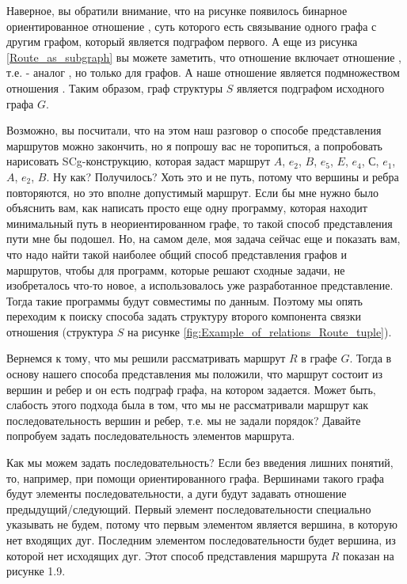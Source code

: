 Наверное, вы обратили внимание, что на рисунке появилось бинарное
ориентированное отношение , суть которого есть
связывание одного графа с другим графом, который является подграфом
первого. А еще из рисунка \ref{Route_as_subgraph} вы можете заметить,
что отношение  включает отношение ,
т.е.  - аналог , но только для
графов. А наше отношение  является подмножеством
отношения . Таким образом, граф структуры $S$ является
подграфом исходного графа $G$.

Возможно, вы посчитали, что на этом наш разговор о способе
представления маршрутов можно закончить, но я попрошу вас не
торопиться, а попробовать нарисовать SCg-конструкцию, которая задаст
маршрут $A$, $e_2$, $B$, $e_5$, $E$, $e_4$, $С$, $e_1$, $A$, $e_2$,
$B$. Ну как? Получилось? Хоть это и не путь, потому что вершины и
ребра повторяются, но это вполне допустимый маршрут. Если бы мне нужно
было объяснить вам, как написать просто еще одну программу, которая
находит минимальный путь в неориентированном графе, то такой способ
представления пути мне бы подошел. Но, на самом деле, моя задача
сейчас еще и показать вам, что надо найти такой наиболее общий способ
представления графов и маршрутов, чтобы для программ, которые решают
сходные задачи, не изобреталось что-то новое, а использовалось уже
разработанное представление. Тогда такие программы будут совместимы по
данным. Поэтому мы опять переходим к поиску способа задать структуру
второго компонента связки отношения  (структура $S$ на
рисунке \ref{fig:Example_of_relations_Route_tuple}).

Вернемся к тому, что мы решили рассматривать маршрут $R$ в графе
$G$. Тогда в основу нашего способа представления мы положили, что
маршрут состоит из вершин и ребер и он есть подграф графа, на котором
задается. Может быть, слабость этого подхода была в том, что мы не
рассматривали маршрут как последовательность вершин и ребер, т.е. мы
не задали порядок? Давайте попробуем задать последовательность
элементов маршрута.

Как мы можем задать последовательность? Если без введения лишних
понятий, то, например, при помощи ориентированного графа. Вершинами
такого графа будут элементы последовательности, а дуги будут задавать
отношение предыдущий/следующий. Первый элемент последовательности
специально указывать не будем, потому что первым элементом является
вершина, в которую нет входящих дуг. Последним элементом
последовательности будет вершина, из которой нет исходящих дуг. Этот
способ представления маршрута $R$ показан на рисунке 1.9.


